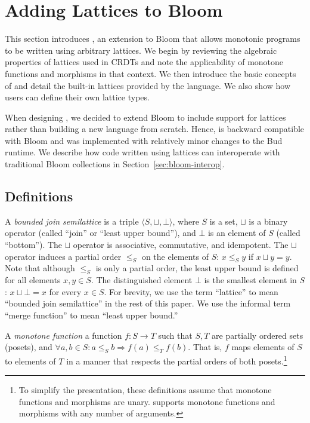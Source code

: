 \section{Adding Lattices to Bloom}
\label{sec:lang}

This section introduces \lang, an extension to Bloom that allows monotonic
programs to be written using arbitrary lattices. We begin by reviewing the
algebraic properties of lattices used in CRDTs and note the applicability of
monotone functions and morphisms in that context. We then introduce the basic
concepts of \lang and detail the built-in lattices provided by the language. We
also show how users can define their own lattice types.

When designing \lang, we decided to extend Bloom to include support for lattices
rather than building a new language from scratch. Hence, \lang is backward
compatible with Bloom and was implemented with relatively minor changes to the
Bud runtime. We describe how code written using lattices can interoperate with
traditional Bloom collections in Section~\ref{sec:bloom-interop}.

\subsection{Definitions}
\label{sec:lattice-defn}
A \emph{bounded join semilattice} is a triple $\langle S, \sqcup, \bot\rangle$,
where $S$ is a set, $\sqcup$ is a binary operator
(called ``join'' or ``least upper bound''), and $\bot$ is an element of $S$
(called ``bottom''). The $\sqcup$ operator
is associative, commutative, and idempotent. The $\sqcup$ operator induces a partial order $\leq_S$ on the elements of $S$: $x \leq_S y$ if $x \sqcup y = y$.
% 
Note
that although $\leq_S$ is only a partial order, the least upper bound is defined for
all elements $x,y \in S$. The distinguished element $\bot$ is the smallest
element in $S$:  $x \sqcup \bot = x$ for every $x \in S$. For brevity,
we use the term ``lattice'' to mean ``bounded join semilattice'' in the rest of
this paper. We use the informal term ``merge function'' to mean ``least upper
bound.''

A \emph{monotone function} a function $f: S \to T$ such that $S,T$ are partially
ordered sets (posets), and $\forall a,b \in S: a \leq_S b \Rightarrow f(a)
\leq_T f(b)$. That is, $f$ maps elements of $S$ to elements of $T$ in a manner
that respects the partial orders of both posets.\footnote{To simplify the
  presentation, these definitions assume that monotone functions and morphisms
  are unary. \lang supports monotone functions and morphisms with any number of
  arguments.}

